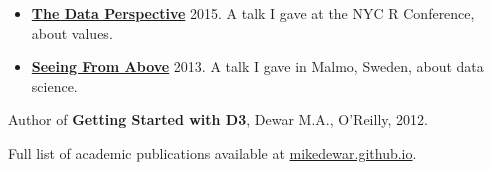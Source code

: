 \documentclass[line, overlapped]{res}
\begin{document}
\begin{resume}
\begin{itemize}
	  \item \href{https://www.youtube.com/watch?v=Jsg4R9z\_Z7M}{\textbf{The Data Perspective}} 2015. A talk I gave at the NYC R Conference, about values.

	  \item \href{http://videos.theconference.se/mike-dewar-big-data-understand-and}{\textbf{Seeing From Above}} 2013. A talk I gave in Malmo, Sweden, about data science.

  \end{itemize}

  Author of \textbf{Getting Started with D3}, Dewar M.A., O'Reilly,
  2012.

  Full list of academic publications available at \href{https://mikedewar.github.io}{mikedewar.github.io}.

\end{resume}
\end{document}
